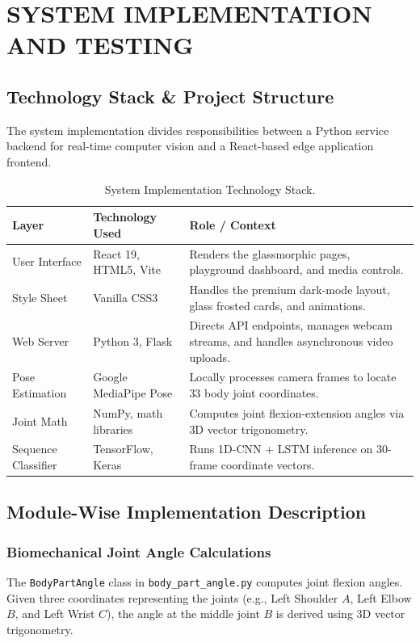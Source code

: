\chapter{SYSTEM IMPLEMENTATION AND TESTING}

\section{Technology Stack \& Project Structure}
The system implementation divides responsibilities between a Python service backend for real-time computer vision and a React-based edge application frontend.
\begin{table}[h]
\centering
\begin{tabular}{p{3.5cm} p{4cm} p{8.5cm}}
\toprule
\textbf{Layer} & \textbf{Technology Used} & \textbf{Role / Context} \\ \midrule
User Interface & React 19, HTML5, Vite & Renders the glassmorphic pages, playground dashboard, and media controls. \\ \midrule
Style Sheet & Vanilla CSS3 & Handles the premium dark-mode layout, glass frosted cards, and animations. \\ \midrule
Web Server & Python 3, Flask & Directs API endpoints, manages webcam streams, and handles asynchronous video uploads. \\ \midrule
Pose Estimation & Google MediaPipe Pose & Locally processes camera frames to locate 33 body joint coordinates. \\ \midrule
Joint Math & NumPy, math libraries & Computes joint flexion-extension angles via 3D vector trigonometry. \\ \midrule
Sequence Classifier & TensorFlow, Keras & Runs 1D-CNN + LSTM inference on 30-frame coordinate vectors. \\ \bottomrule
\end{tabular}
\caption{System Implementation Technology Stack.}
\label{tab:technology_stack}
\end{table}

\section{Module-Wise Implementation Description}

\subsection{Biomechanical Joint Angle Calculations}
The \texttt{BodyPartAngle} class in \texttt{body\_part\_angle.py} computes joint flexion angles. Given three coordinates representing the joints (e.g., Left Shoulder $A$, Left Elbow $B$, and Left Wrist $C$), the angle at the middle joint $B$ is derived using 3D vector trigonometry. 

